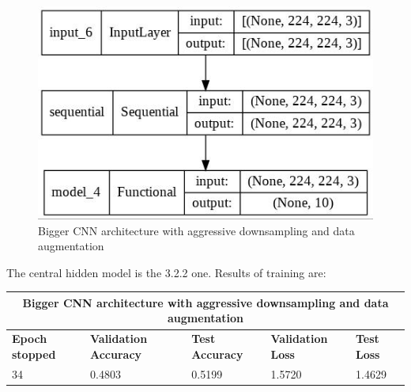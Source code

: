 \begin{figure}[H]
	\centering
	\includegraphics[height=0.4\textwidth]{img/scratch/DataAugmentedAggressiveDownsamplingCNN.jpg}
	\caption{Bigger CNN architecture with aggressive downsampling and data augmentation}
	\label{fig:dataAugmentedAggressiveDownsamplingCNN}
\end{figure}

\medskip

\noindent The central hidden model is the 3.2.2 one. Results of training are:

\medskip

\begin{tabular}{ |p{2cm}|p{2cm}|p{2cm}|p{2cm}|p{2cm}|  }
\hline
\multicolumn{5}{|c|}{Bigger CNN architecture with aggressive downsampling and data augmentation} \\
\hline
\textbf{Epoch stopped} & \textbf{Validation Accuracy} & \textbf{Test Accuracy} & \textbf{Validation Loss} & \textbf{Test Loss} \\
\hline
34 & 0.4803 & 0.5199 & 1.5720 & 1.4629\\
\hline
\end{tabular}

\medskip


